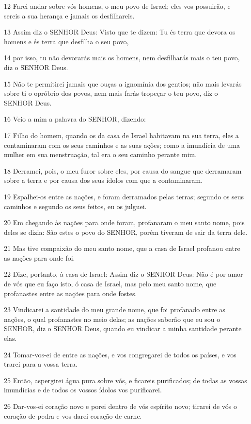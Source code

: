 \par 12 Farei andar sobre vós homens, o meu povo de Israel; eles vos possuirão, e sereis a sua herança e jamais os desfilhareis.
\par 13 Assim diz o SENHOR Deus: Visto que te dizem: Tu és terra que devora os homens e és terra que desfilha o seu povo,
\par 14 por isso, tu não devorarás mais os homens, nem desfilharás mais o teu povo, diz o SENHOR Deus.
\par 15 Não te permitirei jamais que ouças a ignomínia dos gentios; não mais levarás sobre ti o opróbrio dos povos, nem mais farás tropeçar o teu povo, diz o SENHOR Deus.
\par 16 Veio a mim a palavra do SENHOR, dizendo:
\par 17 Filho do homem, quando os da casa de Israel habitavam na sua terra, eles a contaminaram com os seus caminhos e as suas ações; como a imundícia de uma mulher em sua menstruação, tal era o seu caminho perante mim.
\par 18 Derramei, pois, o meu furor sobre eles, por causa do sangue que derramaram sobre a terra e por causa dos seus ídolos com que a contaminaram.
\par 19 Espalhei-os entre as nações, e foram derramados pelas terras; segundo os seus caminhos e segundo os seus feitos, eu os julguei.
\par 20 Em chegando às nações para onde foram, profanaram o meu santo nome, pois deles se dizia: São estes o povo do SENHOR, porém tiveram de sair da terra dele.
\par 21 Mas tive compaixão do meu santo nome, que a casa de Israel profanou entre as nações para onde foi.
\par 22 Dize, portanto, à casa de Israel: Assim diz o SENHOR Deus: Não é por amor de vós que eu faço isto, ó casa de Israel, mas pelo meu santo nome, que profanastes entre as nações para onde fostes.
\par 23 Vindicarei a santidade do meu grande nome, que foi profanado entre as nações, o qual profanastes no meio delas; as nações saberão que eu sou o SENHOR, diz o SENHOR Deus, quando eu vindicar a minha santidade perante elas.
\par 24 Tomar-vos-ei de entre as nações, e vos congregarei de todos os países, e vos trarei para a vossa terra.
\par 25 Então, aspergirei água pura sobre vós, e ficareis purificados; de todas as vossas imundícias e de todos os vossos ídolos vos purificarei.
\par 26 Dar-vos-ei coração novo e porei dentro de vós espírito novo; tirarei de vós o coração de pedra e vos darei coração de carne.
